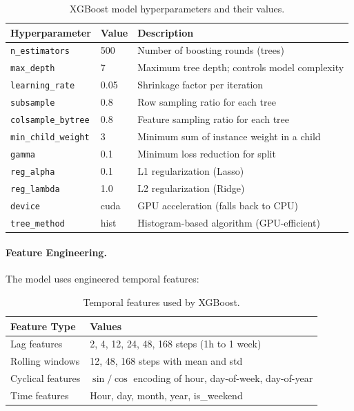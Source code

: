 \documentclass[12pt,a4paper]{article}
\begin{document}
\begin{table}[H]
\centering
\caption{XGBoost model hyperparameters and their values.}
\label{tab:xgb_params}
\begin{tabular}{@{}llp{7cm}@{}}
\toprule
\textbf{Hyperparameter} & \textbf{Value} & \textbf{Description} \\ \midrule
\texttt{n\_estimators} & 500 & Number of boosting rounds (trees) \\
\texttt{max\_depth} & 7 & Maximum tree depth; controls model complexity \\
\texttt{learning\_rate} & 0.05 & Shrinkage factor per iteration \\
\texttt{subsample} & 0.8 & Row sampling ratio for each tree \\
\texttt{colsample\_bytree} & 0.8 & Feature sampling ratio for each tree \\
\texttt{min\_child\_weight} & 3 & Minimum sum of instance weight in a child \\
\texttt{gamma} & 0.1 & Minimum loss reduction for split \\
\texttt{reg\_alpha} & 0.1 & L1 regularization (Lasso) \\
\texttt{reg\_lambda} & 1.0 & L2 regularization (Ridge) \\
\texttt{device} & cuda & GPU acceleration (falls back to CPU) \\
\texttt{tree\_method} & hist & Histogram-based algorithm (GPU-efficient) \\
\bottomrule
\end{tabular}
\end{table}

\paragraph{Feature Engineering.} The model uses engineered temporal features:

\begin{table}[H]
\centering
\caption{Temporal features used by XGBoost.}
\label{tab:xgb_features}
\begin{tabular}{@{}lp{9cm}@{}}
\toprule
\textbf{Feature Type} & \textbf{Values} \\ \midrule
Lag features & 2, 4, 12, 24, 48, 168 steps (1h to 1 week) \\
Rolling windows & 12, 48, 168 steps with mean and std \\
Cyclical features & $\sin/\cos$ encoding of hour, day-of-week, day-of-year \\
Time features & Hour, day, month, year, is\_weekend \\
\bottomrule
\end{tabular}
\end{table}
\end{document}
